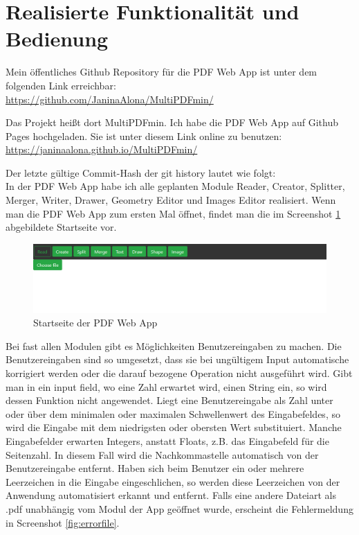 \section{Realisierte Funktionalität und Bedienung}
Mein öffentliches Github Repository für die PDF Web App ist unter dem folgenden Link erreichbar: \\
\url{https://github.com/JaninaAlona/MultiPDFmin/}

Das Projekt heißt dort MultiPDFmin. Ich habe die PDF Web App auf Github Pages hochgeladen. Sie ist unter diesem Link online zu benutzen: \\
\url{https://janinaalona.github.io/MultiPDFmin/}

Der letzte gültige Commit-Hash der git history lautet wie folgt: \\

In der PDF Web App habe ich alle geplanten Module Reader, Creator, Splitter, Merger, Writer, Drawer, Geometry Editor und Images Editor realisiert. Wenn man die PDF Web App zum ersten Mal öffnet, findet man die im Screenshot \ref{fig:start} abgebildete Startseite vor.

\begin{figure}[!htbp]
	\centering
	\includegraphics[width=1\textwidth]{"images/startseite.png"}
	\caption{Startseite der PDF Web App}
	\label{fig:start}
\end{figure}

Bei fast allen Modulen gibt es Möglichkeiten Benutzereingaben zu machen. Die Benutzereingaben sind so umgesetzt, dass sie bei ungültigem Input automatische korrigiert werden oder die darauf bezogene Operation nicht ausgeführt wird. Gibt man in ein input field, wo eine Zahl erwartet wird, einen String ein, so wird dessen Funktion nicht angewendet. Liegt eine Benutzereingabe als Zahl unter oder über dem minimalen oder maximalen Schwellenwert des Eingabefeldes, so wird die Eingabe mit dem niedrigsten oder obersten Wert substituiert. Manche Eingabefelder erwarten Integers, anstatt Floats, z.B. das Eingabefeld für die Seitenzahl. In diesem Fall wird die Nachkommastelle automatisch von der Benutzereingabe entfernt. Haben sich beim Benutzer ein oder mehrere Leerzeichen in die Eingabe eingeschlichen, so werden diese Leerzeichen von der Anwendung automatisiert erkannt und entfernt. Falls eine andere Dateiart als .pdf unabhängig vom Modul der App geöffnet wurde, erscheint die Fehlermeldung in Screenshot \ref{fig:errorfile}. 

